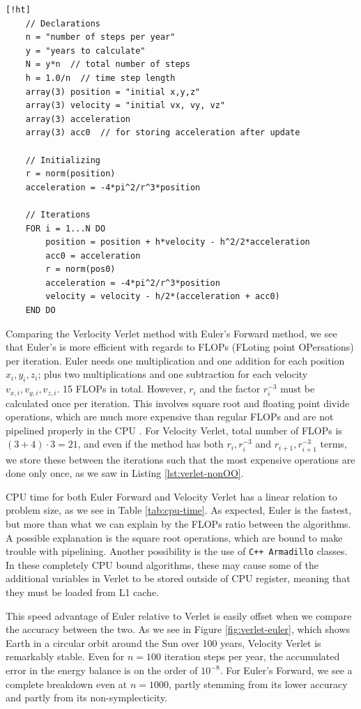 \documentclass[]{article}
\begin{document}
\begin{lstlisting}[caption={Velocity Verlet algorithm for Sun-Earth system with fixed Sun.},label={lst:verlet-nonOO}] [!ht]
	// Declarations
	n = "number of steps per year"
	y = "years to calculate"
	N = y*n  // total number of steps
	h = 1.0/n  // time step length
	array(3) position = "initial x,y,z"
	array(3) velocity = "initial vx, vy, vz"
	array(3) acceleration
	array(3) acc0  // for storing acceleration after update
	
	// Initializing
	r = norm(position)
	acceleration = -4*pi^2/r^3*position
	
	// Iterations
	FOR i = 1...N DO
		position = position + h*velocity - h^2/2*acceleration
		acc0 = acceleration
		r = norm(pos0)
		acceleration = -4*pi^2/r^3*position
		velocity = velocity - h/2*(acceleration + acc0)
	END DO
\end{lstlisting}

Comparing the Verlocity Verlet method with Euler's Forward method, we see that Euler's is more efficient with regards to FLOPs (FLoting point OPersations) per iteration. Euler needs one multiplication and one addition for each position $x_i, y_i, z_i$; plus two multiplications and one subtraction for each velocity $v_{x,i}, v_{y,i}, v_{z,i}$. 15 FLOPs in total. However, $r_i$ and the factor $r_i^{-3}$ must be calculated once per iteration. This involves square root and floating point divide operations, which are much more expensive than regular FLOPs and are not pipelined properly in the CPU \cite{hager2010introduction}. For Velocity Verlet, total number of FLOPs is $(3+4) \cdot 3=21$, and even if the method has both $r_i, r_i^{-3}$ and $r_{i+1}, r_{i+1}^{-3}$ terms, we store these between the iterations such that the most expensive operations are done only once, as we saw in Listing \ref{lst:verlet-nonOO}.

CPU time for both Euler Forward and Velocity Verlet has a linear relation to problem size, as we see in Table \ref*{tab:cpu-time}. As expected, Euler is the fastest, but more than what we can explain by the FLOPs ratio between the algorithms. A possible explanation is the square root operations, which are bound to make trouble with pipelining. Another possibility is the use of \lstinline|C++ Armadillo| classes. In these completely CPU bound algorithms, these may cause some of the additional variables in Verlet to be stored outside of CPU register, meaning that they must be loaded from L1 cache.

This speed advantage of Euler relative to Verlet is easily offset when we compare the accuracy between the two. As we see in Figure \ref{fig:verlet-euler}, which shows Earth in a circular orbit around the Sun over 100 years, Velocity Verlet is remarkably stable. Even for $n=100$ iteration steps per year, the accumulated error in the energy balance is on the order of $10^{-8}$. For Euler's Forward, we see a complete breakdown even at $n=1000$, partly stemming from its lower accuracy and partly from its non-symplecticity. 
\end{document}
